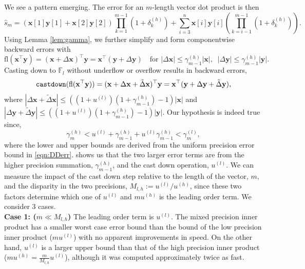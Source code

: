 \documentclass[review,onefignum,onetabnum]{siamart190516}
\newcommand{\F}{\mathbb{F}}
\newcommand{\dd}{\delta}
\newcommand{\bb}[1]{\mathbf{#1}}
\newcommand{\fl}{\mathrm{fl}}
\begin{document}
We see a pattern emerging. 
The error for an $m$-length vector dot product is then
\begin{equation}
\label{eqn:dperr_2}
\hat{s}_m = (\bb{x}[1]\bb{y}[1]+\bb{x}[2]\bb{y}[2])\prod_{k=1}^{m-1}(1+\dd_{k}^{(h)}) + \sum_{i=3}^n \bb{x}[i]\bb{y}[i]\left(\prod_{k=i-1}^{m-1}(1+\dd_{k}^{(h)})\right).
\end{equation}
Using Lemma \ref{lem:gamma}, we further simplify and form componentwise backward errors with
\begin{equation}
\fl(\bb{x}^{\top}\bb{y}) =(\bb{x}+\Delta\bb{x})^{\top}\bb{y} = \bb{x}^{\top}(\bb{y}+\Delta\bb{y})\quad\text{for }|\Delta \bb{x}| \leq \gamma^{(h)}_{m-1}|\bb{x}|,\;\; |\Delta \bb{y}|  \leq \gamma_{m-1}^{(h)}|\bb{y}|. \label{eqn:beforecd}
\end{equation}
Casting down to $\F_l$ without underflow or overflow results in backward errors, 
\begin{equation}
\text{\tt castdown}(\fl(\bb{x}^{\top}\bb{y})) = (\bb{x}+\Delta\bb{x}+\tilde{\Delta}\bb{x})^{\top}\bb{y} = \bb{x}^{\top}(\bb{y}+\Delta\bb{y}+\tilde{\Delta}\bb{y}), \label{eqn:aftercd}
\end{equation}
where $|\Delta\bb{x} + \tilde{\Delta} \bb{x}| \leq ((1+u^{(l)})(1+\gamma_{m-1}^{(h)})-1)|\bb{x}|$ and $|\Delta\bb{y}+\tilde{\Delta} \bb{y}| \leq ((1+u^{(l)})(1+\gamma_{m-1}^{(h)})-1)|\bb{y}|$.
Our hypothesis is indeed true since,
\[\gamma_m^{(h)}<u^{(l)}+\gamma_{m-1}^{(h)}+u^{(l)}\gamma_{m-1}^{(h)}<\gamma_{m}^{(l)},\]
where the lower and upper bounds are derived from the uniform precision error bound in \cref{eqn:DDerr}. 
 shows us that the two larger error terms are from the higher precision summation, $\gamma_{m-1}^{(h)}$, and the cast down operation, $u^{(l)}$.
We can measure the impact of the cast down step relative to the length of the vector, $m$, and the disparity in the two precisions, $M_{l,h}:=u^{(l)}/u^{(h)}$, since these two factors determine which one of $u^{(l)}$ and $mu^{(h)}$ is the leading order term. 
We consider 3 cases.\\
\textbf{Case 1: ($m\ll M_{l,h}$)} The leading order term is $u^{(l)}$.
The mixed precision inner product has a smaller worst case error bound than the bound of the low precision inner product ($mu^{(l)}$) with no apparent improvements in speed.
On the other hand, $u^{(l)}$ is a larger upper bound than that of the high precision inner product ($mu^{(h)}=\frac{m}{M_{l,h}}u^{(l)}$), although it was computed approximately twice as fast. 
\end{document}
